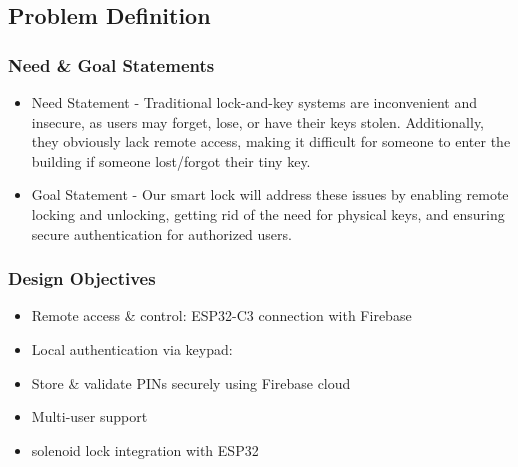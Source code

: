 \subsection{Problem Definition}

\subsubsection{Need \& Goal Statements}
\begin{itemize}
    \item Need Statement - Traditional lock-and-key systems are inconvenient and insecure, as users may forget, lose, or have their keys stolen. Additionally, they obviously lack remote access, making it difficult for someone to enter the building if someone lost/forgot their tiny key.
    
    \item Goal Statement - Our smart lock will address these issues by enabling remote locking and unlocking, getting rid of the need for physical keys, and ensuring secure authentication for authorized users.
\end{itemize}


\subsubsection{Design Objectives}
\begin{itemize}
    \item Remote access \& control: ESP32-C3 connection with Firebase
    
    \item Local authentication via keypad:
    \item Store \& validate PINs securely using Firebase cloud
    \item Multi-user support
    \item solenoid lock integration with ESP32

\end{itemize}